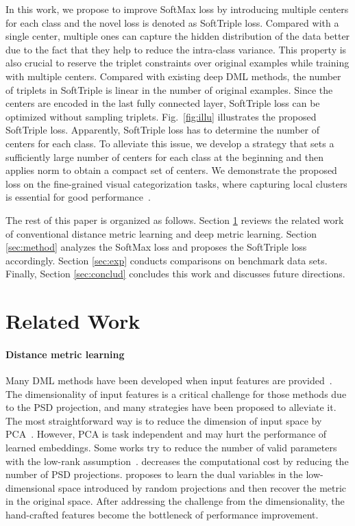 \documentclass[10pt,twocolumn,letterpaper]{article}
\begin{document}
In this work, we propose to improve SoftMax loss by introducing multiple centers for each class and the novel loss is denoted as SoftTriple loss. Compared with a single center, multiple ones can capture the hidden distribution of the data better due to the fact that they help to reduce the intra-class variance. This property is also crucial to reserve the triplet constraints over original examples while training with multiple centers. Compared with existing deep DML methods, the number of triplets in SoftTriple is linear in the number of original examples. Since the centers are encoded in the last fully connected layer, SoftTriple loss can be optimized without sampling triplets. Fig.~\ref{fig:illu} illustrates the proposed SoftTriple loss. Apparently, SoftTriple loss has to determine the number of centers for each class. To alleviate this issue, we develop a strategy that sets a sufficiently large number of centers for each class at the beginning and then applies  norm to obtain a compact set of centers. We demonstrate the proposed loss on the fine-grained visual categorization tasks, where capturing local clusters is essential for good performance~\cite{QianJZL15}.

The rest of this paper is organized as follows. Section \ref{sec:related} reviews the related work of conventional distance metric learning and deep metric learning. Section \ref{sec:method} analyzes the SoftMax loss and proposes the SoftTriple loss accordingly. Section \ref{sec:exp} conducts comparisons on benchmark data sets. Finally, Section \ref{sec:conclud} concludes this work and discusses future directions.


\section{Related Work}
\label{sec:related}
\paragraph{Distance metric learning}
Many DML methods have been developed when input features are provided~\cite{WeinbergerS09,XingNJR02}. The dimensionality of input features is a critical challenge for those methods due to the PSD projection, and many strategies have been proposed to alleviate it. The most straightforward way is to reduce the dimension of input space by PCA~\cite{WeinbergerS09}. However, PCA is task independent and may hurt the performance of learned embeddings. Some works try to reduce the number of valid parameters with the low-rank assumption~\cite{LimLM13}. \cite{QianJY0Z15} decreases the computational cost by reducing the number of PSD projections. \cite{QianJZL15} proposes to learn the dual variables in the low-dimensional space introduced by random projections and then recover the metric in the original space. After addressing the challenge from the dimensionality, the hand-crafted features become the bottleneck of performance improvement. 
\end{document}
